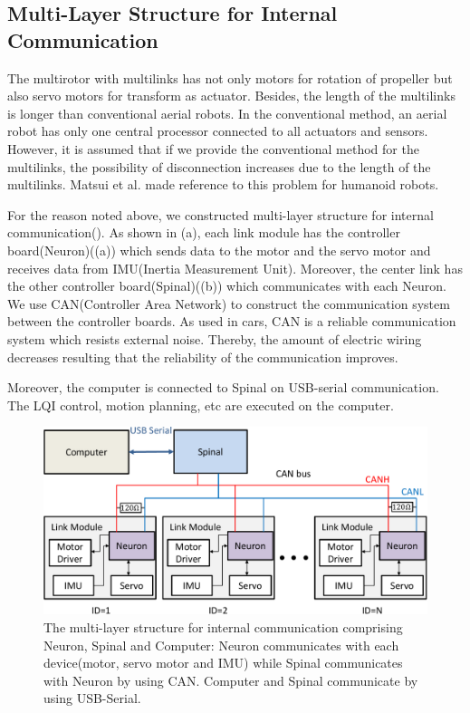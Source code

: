 \subsection{Multi-Layer Structure for Internal Communication}
The multirotor with multilinks has not only motors for rotation of propeller but also servo motors for transform as actuator. Besides, the length of the multilinks is longer than conventional aerial robots. In the conventional method, an aerial robot has only one central processor connected to all actuators and sensors. However, it is assumed that if we provide the conventional method for the multilinks, the possibility of disconnection increases due to the length of the multilinks. Matsui et al.\cite{Matsui2005} made reference to this problem for humanoid robots.
\par
For the reason noted above, we constructed multi-layer structure for internal communication(). As shown in (a), each link module has the controller board(Neuron)((a)) which sends data to the motor and the servo motor and receives data from IMU(Inertia Measurement Unit). Moreover, the center link has the other controller board(Spinal)((b)) which communicates with each Neuron. We use CAN(Controller Area Network)\cite{CAN} to construct the communication system between the controller boards. As used in cars, CAN is a reliable communication system which resists external noise. Thereby, the amount of electric wiring decreases resulting that the reliability of the communication improves. 
\par
Moreover, the computer is connected to Spinal on USB-serial communication. The LQI control, motion planning, etc are executed on the computer.
\begin{figure}[t]
  \begin{center}
    \includegraphics[width=1.0\columnwidth]{figs/internal_communication.pdf}
  \end{center}
  \caption{The multi-layer structure for internal communication comprising Neuron, Spinal and Computer: Neuron communicates with each device(motor, servo motor and IMU) while Spinal communicates with Neuron by using CAN. Computer and Spinal communicate by using USB-Serial.\label{figure:internal_communication}}
\end{figure}
